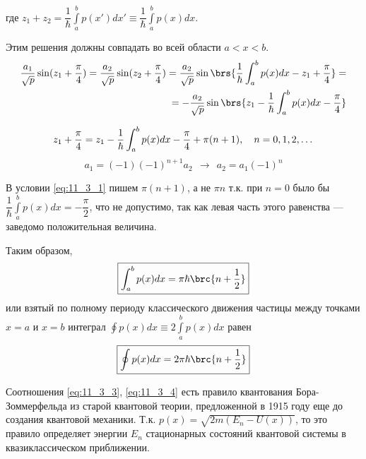 где $z_1+z_2 = \dfrac{1}{\hbar} \int \limits_{a}^{b} p(x')dx' \equiv \dfrac{1}{\hbar} \int \limits_{a}^{b} p(x)dx$.

Этим решения должны совпадать во всей области $a < x < b$.
$$
\begin{aligned}
\frac{a_1}{\sqrt{p}} \sin({z_1+\frac{\pi}{4}}) = \frac{a_2}{\sqrt{p}} \sin({z_2+\frac{\pi}{4}}) = \frac{a_2}{\sqrt{p}} \sin\brs{\frac{1}{\hbar} \int_{a}^{b} p(x)dx - z_1 + \frac{\pi}{4}} = \\
= -\frac{a_2}{\sqrt{p}} \sin\brs{z_1 - \frac{1}{\hbar} \int_{a}^{b} p(x)dx - \frac{\pi}{4} }
\end{aligned}
$$

\begin{equation}
\label{eq:11_3_1}
z_1 + \frac{\pi}{4} = z_1 - \frac{1}{\hbar} \int_{a}^{b} p(x)dx - \frac{\pi}{4} + \pi(n+1),~~~n = 0, 1, 2, \dots \\
\end{equation}
\begin{equation}
\label{eq:11_3_2}
a_1 = (-1)(-1)^{n+1}a_2  ~~\rightarrow~~ a_2 = a_1 (-1)^n
\end{equation}

В условии \eqref{eq:11_3_1} пишем $\pi (n+1)$, а не $\pi n$ т.к. при $n=0$ было бы $\dfrac{1}{\hbar}\int \limits_{a}^{b} p(x) dx = -\dfrac{\pi}{2}$, что не допустимо, так как левая часть этого равенства --- заведомо положительная величина.

Таким образом, 
\begin{equation}
\label{eq:11_3_3}
\boxed{\int_{a}^{b} p(x)dx = \pi\hbar\brc{n+\frac{1}{2}}}
\end{equation}
или взятый по полному периоду классического движения частицы между точками $x=a$ и $x=b$ интеграл $\oint p(x)dx \equiv 2 \int \limits_{a}^{b} p(x)dx$ равен
\begin{equation}
\label{eq:11_3_4}
\boxed{\oint p(x)dx = 2\pi\hbar\brc{n+\frac{1}{2}}}
\end{equation}

Соотношения \eqref{eq:11_3_3}, \eqref{eq:11_3_4} есть правило квантования Бора-Зоммерфельда из старой квантовой теории, предложенной в 1915 году еще до создания квантовой механики. Т.к. $p(x) = \sqrt{2m(E_n - U(x))}$, то это правило определяет энергии $E_n$ стационарных состояний квантовой системы в квазиклассическом приближении.

